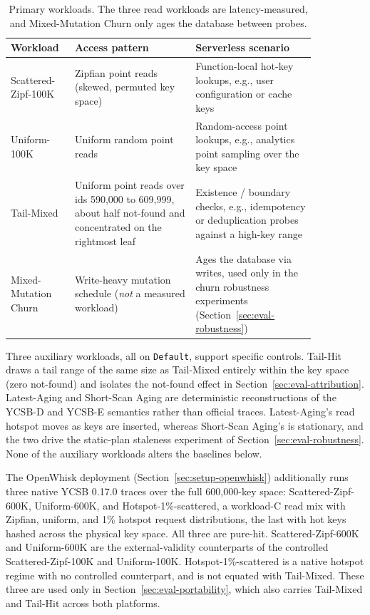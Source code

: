 \documentclass[sigconf, nonacm]{acmart}
\begin{document}
\begin{table}[htbp]
\centering
\caption{Primary workloads. The three read workloads are latency-measured, and Mixed-Mutation Churn only ages the database between probes.}
\begin{tabular}{p{0.15\linewidth}p{0.35\linewidth}p{0.35\linewidth}}
\toprule
\textbf{Workload} & \textbf{Access pattern} & \textbf{Serverless scenario} \\
\midrule
Scattered-Zipf-100K & Zipfian point reads (skewed, permuted key space) & Function-local hot-key lookups, e.g., user configuration or cache keys \\
Uniform-100K & Uniform random point reads & Random-access point lookups, e.g., analytics point sampling over the key space \\
Tail-Mixed & Uniform point reads over ids 590,000 to 609,999, about half not-found and concentrated on the rightmost leaf & Existence / boundary checks, e.g., idempotency or deduplication probes against a high-key range \\
Mixed-Mutation Churn & Write-heavy mutation schedule (\emph{not} a measured workload) & Ages the database via writes, used only in the churn robustness experiments (Section~\ref{sec:eval-robustness}) \\
\bottomrule
\end{tabular}
\label{tab:workloads}
\end{table}

Three auxiliary workloads, all on \texttt{Default}, support specific controls. Tail-Hit draws a tail range of the same size as Tail-Mixed entirely within the key space (zero not-found) and isolates the not-found effect in Section~\ref{sec:eval-attribution}. Latest-Aging and Short-Scan Aging are deterministic reconstructions of the YCSB-D and YCSB-E semantics rather than official traces. Latest-Aging's read hotspot moves as keys are inserted, whereas Short-Scan Aging's is stationary, and the two drive the static-plan staleness experiment of Section~\ref{sec:eval-robustness}. None of the auxiliary workloads alters the baselines below.

The OpenWhisk deployment (Section~\ref{sec:setup-openwhisk}) additionally runs three native YCSB 0.17.0 traces over the full 600,000-key space: Scattered-Zipf-600K, Uniform-600K, and Hotspot-1\%-scattered, a workload-C read mix with Zipfian, uniform, and 1\% hotspot request distributions, the last with hot keys hashed across the physical key space. All three are pure-hit. Scattered-Zipf-600K and Uniform-600K are the external-validity counterparts of the controlled Scattered-Zipf-100K and Uniform-100K. Hotspot-1\%-scattered is a native hotspot regime with no controlled counterpart, and is not equated with Tail-Mixed. These three are used only in Section~\ref{sec:eval-portability}, which also carries Tail-Mixed and Tail-Hit across both platforms.
\end{document}
